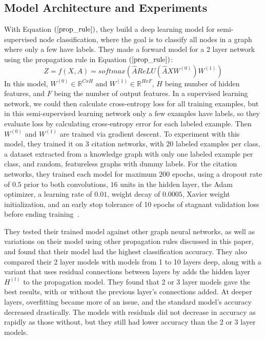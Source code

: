 \subsection{Model Architecture and Experiments}
With Equation $(\ref{prop_rule})$, they build a deep learning model for semi-supervised node classification, where the goal is to classify all nodes in a graph where only a few have labels. They made a forward model for a 2 layer network using the propagation rule in Equation $(\ref{prop_rule})$:
\begin{equation}
\label{forward_model}
Z = f(X, A) = softmax(\hat{A} ReLU(\hat{A}XW^{(0)})W^{(1)})
\end{equation}
In this model, $W^{(0)} \in \mathbb{R}^{C x H}$ and $W^{(1)} \in \mathbb{R}^{H x F}$, $H$ being number of hidden features, and $F$ being the number of output features.
In a supervised learning network, we could then calculate cross-entropy loss for all training examples, but in this semi-supervised learning network only a few examples have labels, so they evaluate loss by calculating cross-entropy error for each labeled example. Then $W^{(0)}$ and $W^{(1)}$ are trained via gradient descent.
To experiment with this model, they trained it on 3 citation networks, with 20 labeled examples per class, a dataset extracted from a knowledge graph with only one labeled example per class, and random, featureless graphs with dummy labels. For the citation networks, they trained each model for maximum $200$ epochs, using a dropout rate of $0.5$ prior to both convolutions, $16$ units in the hidden layer, the Adam optimizer, a learning rate of $0.01$, weight decay of $0.0005$, Xavier weight initialization, and an early stop tolerance of 10 epochs of stagnant validation loss before ending training~\cite{Kipf2016}. 

They tested their trained model against other graph neural networks, as well as variations on their model using other propagation rules discussed in this paper, and found that their model had the highest classification accuracy. They also compared their 2 layer models with models from 1 to 10 layers deep, along with a variant that uses residual connections between layers by adds the hidden layer $H^{(l)}$ to the propagation model. They found that 2 or 3 layer models gave the best results, with or without the previous layer's connections added. At deeper layers, overfitting became more of an issue, and the standard model's accuracy decreased drastically. The models with residuals did not decrease in accuracy as rapidly as those without, but they still had lower accuracy than the 2 or 3 layer models. 